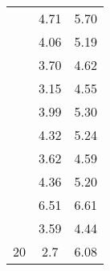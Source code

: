 \documentclass[12pt]{article}
\begin{document}
\begin{table}[h]
\begin{center}
\begin{tabular}{|c|c|c|}
			& 4.71 & 5.70\\
			& 4.06 & 5.19\\
			& 3.70 & 4.62\\
			& 3.15 & 4.55\\
			& 3.99 & 5.30\\
			& 4.32 & 5.24\\
			& 3.62 & 4.59\\
			& 4.36 & 5.20\\
			& 6.51 & 6.61\\
			& 3.59 & 4.44\\
			\hline
			20 & 2.7 & 6.08\\
			\hline
		\end{tabular}
	\end{center}
\end{table}
\end{document}
